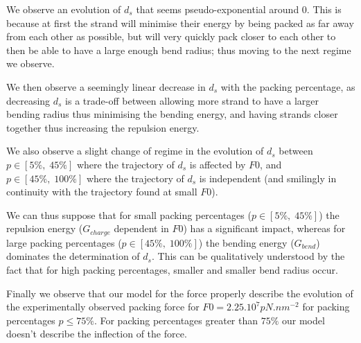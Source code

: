 \documentclass{article}
\begin{document}
We observe an evolution of $d_s$ that seems pseudo-exponential around $0$. This is because at first the strand will minimise their energy by being packed as far away from each other as possible, but will very quickly pack closer to each other to then be able to have a large enough bend radius; thus moving to the next regime we observe.

We then observe a seemingly linear decrease in $d_s$ with the packing percentage, as decreasing $d_s$ is a trade-off between allowing more strand to have a larger bending radius thus minimising the bending energy, and having strands closer together thus increasing the repulsion energy.

We also observe a slight change of regime in the evolution of $d_s$ between $p \in \left[5\%,\;45\%\right]$ where the trajectory of $d_s$ is affected by $F0$, and $p \in \left[45\%,\;100\%\right]$ where the trajectory of $d_s$ is independent (and smilingly in continuity with the trajectory found at small $F0$).

We can thus suppose that for small packing percentages ($p \in \left[5\%,\;45\%\right]$) the repulsion energy ($G_{charge}$ dependent in $F0$) has a significant impact, whereas for large packing percentages ($p \in \left[45\%,\;100\%\right]$) the bending energy ($G_{bend}$) dominates the determination of $d_s$. This can be qualitatively understood by the fact that for high packing percentages, smaller and smaller bend radius occur.

Finally we observe that our model for the force properly describe the evolution of the experimentally observed packing force for $F0=2.25.10^7pN.nm^{-2}$ for packing percentages $p \leq 75\%$. For packing percentages greater than $75\%$ our model doesn't describe the inflection of the force.
\end{document}
